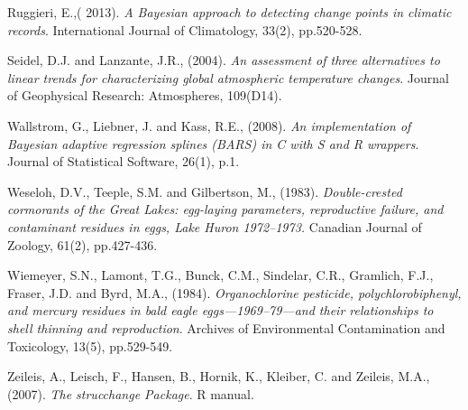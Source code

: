 \documentclass[submit]{smj}
\begin{document}
\begin{thebibliography}{99}
Ruggieri, E.,( 2013). 
\textit{A Bayesian approach to detecting change points in climatic records}.
International Journal of Climatology, 33(2), pp.520-528.

Seidel, D.J. and Lanzante, J.R., (2004). 
\textit{An assessment of three alternatives to linear trends for characterizing global atmospheric temperature changes}. 
Journal of Geophysical Research: Atmospheres, 109(D14). 

Wallstrom, G., Liebner, J. and Kass, R.E., (2008). 
\textit{An implementation of Bayesian adaptive regression splines (BARS) in C with S and R wrappers}. 
Journal of Statistical Software, 26(1), p.1.

Weseloh, D.V., Teeple, S.M. and Gilbertson, M., (1983). 
\textit{Double-crested cormorants of the Great Lakes: egg-laying parameters, reproductive failure, and contaminant residues in eggs, Lake Huron 1972–1973.} Canadian Journal of Zoology, 61(2), pp.427-436.

Wiemeyer, S.N., Lamont, T.G., Bunck, C.M., Sindelar, C.R., Gramlich, F.J., Fraser, J.D. and Byrd, M.A., (1984). 
\textit{Organochlorine pesticide, polychlorobiphenyl, and mercury residues in bald eagle eggs—1969–79—and their relationships to shell thinning and reproduction}.
Archives of Environmental Contamination and Toxicology, 13(5), pp.529-549.

Zeileis, A., Leisch, F., Hansen, B., Hornik, K., Kleiber, C. and Zeileis, M.A., (2007). 
\textit{The strucchange Package}.
R manual.


\end{thebibliography}
\end{document}
